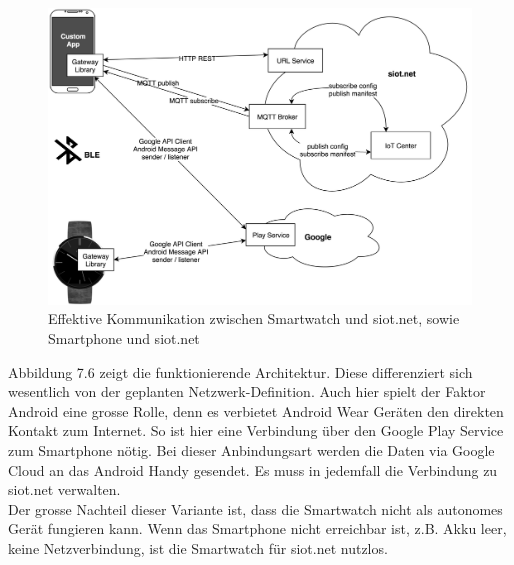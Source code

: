 \newpage
\begin{figure}[h]
  \centering
  \includegraphics[scale=0.15]{98_Bilder/07_Architektur/04_Architektur}
  \caption[Effektive Netzwerk-Architektur mit BLE/ohne WLAN]{Effektive Kommunikation zwischen Smartwatch und siot.net, sowie Smartphone und siot.net}
\end{figure}
Abbildung 7.6 zeigt die funktionierende Architektur. Diese differenziert sich wesentlich von der geplanten Netzwerk-Definition. Auch hier spielt der Faktor Android eine grosse Rolle, denn es verbietet Android Wear Geräten den direkten Kontakt zum Internet. So ist hier eine Verbindung über den Google Play Service zum Smartphone nötig. Bei dieser Anbindungsart werden die Daten via Google Cloud an das Android Handy gesendet. Es muss in jedemfall die Verbindung zu siot.net verwalten.\\
Der grosse Nachteil dieser Variante ist, dass die Smartwatch nicht als autonomes Gerät fungieren kann. Wenn das Smartphone nicht erreichbar ist, z.B. Akku leer, keine Netzverbindung, ist die Smartwatch für siot.net nutzlos.
